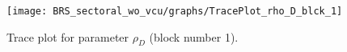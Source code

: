 \begin{figure}[H]
\centering
  \texttt{[image: BRS\_sectoral\_wo\_vcu/graphs/TracePlot\_rho\_D\_blck\_1]}\\
    \caption{Trace plot for parameter ${\rho_D}$ (block number 1).}
\end{figure}
